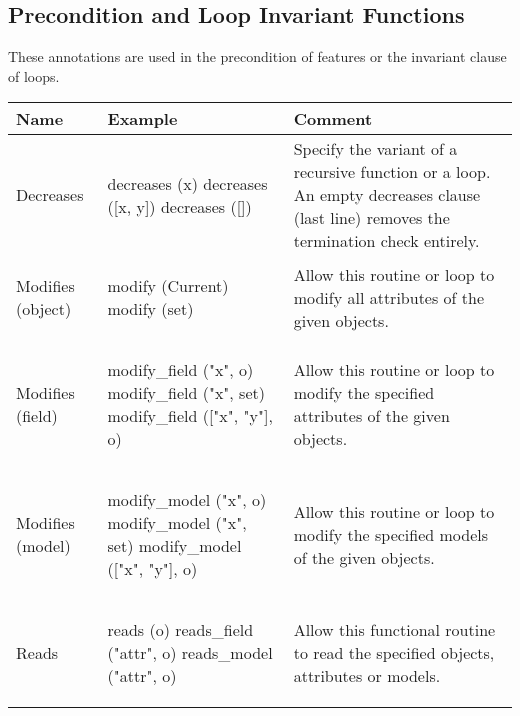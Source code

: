 \subsection{Precondition and Loop Invariant Functions}

These annotations are used in the precondition of features or the invariant clause of loops.

\noindent
\begin{longtable}{|m{1.9cm}|l|m{5.6cm}|}
\hline
\textbf{Name} & \textbf{Example} & \textbf{Comment} \\ \endhead  \hline

Decreases &
{\begin{erunning}
decreases (x)
decreases ([x, y])
decreases ([])
\end{erunning}} &
Specify the variant of a recursive function or a loop. An empty decreases clause (last line) removes the termination check entirely.
\\ \hline

Modifies \newline (object) &
{\begin{erunning}
modify (Current)
modify (set)
\end{erunning}} &
Allow this routine or loop to modify all attributes of the given objects.
\\ \hline

Modifies \newline (field) &
{\begin{erunning}
modify_field ("x", o)
modify_field ("x", set)
modify_field (["x", "y"], o)
\end{erunning}} &
Allow this routine or loop to modify the specified attributes of the given objects.
\\ \hline

Modifies \newline (model) &
{\begin{erunning}
modify_model ("x", o)
modify_model ("x", set)
modify_model (["x", "y"], o)
\end{erunning}} &
Allow this routine or loop to modify the specified models of the given objects.
\\ \hline

Reads &
{\begin{erunning}
reads (o)
reads_field ("attr", o)
reads_model ("attr", o)
\end{erunning}} &
Allow this functional routine to read the specified objects, attributes or models.
\\ \hline

\end{longtable}

